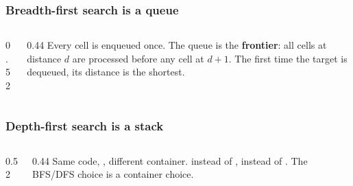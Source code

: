 \documentclass[aspectratio=169,10pt,compress]{beamer}
\begin{document}




\begin{frame}[t,fragile] \frametitle{Breadth-first search is a queue}
  \begin{columns}[T]
    \begin{column}{0.52\textwidth}
    \end{column}
    \begin{column}{0.44\textwidth}
      \small
      Every cell is enqueued once. The queue is the \textbf{frontier}:
      all cells at distance $d$ are processed before any cell at $d+1$.
      The first time the target is dequeued, its distance is the shortest.
    \end{column}
  \end{columns}
\end{frame}




\begin{frame}[t,fragile] \frametitle{Depth-first search is a stack}
  \begin{columns}[T]
    \begin{column}{0.52\textwidth}
    \end{column}
    \begin{column}{0.44\textwidth}
      \small
      Same code, , different container.
       instead of ,  instead of .
      The BFS/DFS choice is a container choice.
    \end{column}
  \end{columns}
\end{frame}
\end{document}

